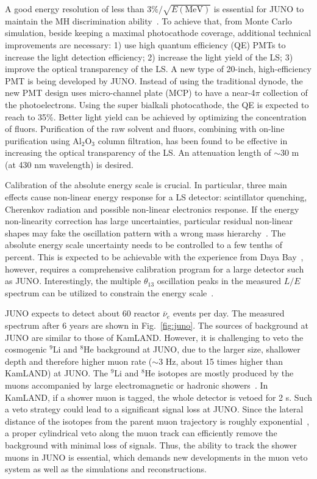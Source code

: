 A good energy resolution of less than $3\%/\sqrt{E(\textrm{MeV})}$ is essential for JUNO to maintain the MH discrimination ability~\cite{Li-PRD13}. 
To achieve that, from Monte Carlo simulation, beside keeping a maximal photocathode coverage, additional technical improvements are necessary: 
1) use high quantum efficiency (QE) PMTs to increase the light detection efficiency;
2) increase the light yield of the LS;
3) improve the optical transparency of the LS.
A new type of 20-inch, high-efficiency PMT is being developed by JUNO. Instead of using the traditional dynode, the new PMT design uses micro-channel plate (MCP) to have a near-4$\pi$ collection of the photoelectrons. 
Using the super bialkali photocathode, the QE is expected to reach to 35\%. 
Better light yield can be achieved by optimizing the concentration of fluors. 
Purification of the raw solvent and fluors, combining with on-line purification using Al$_2$O$_3$ column filtration, has been found to be effective in increasing the optical transparency of the LS. An attenuation length of $\sim$30 m (at 430 nm wavelength) is desired.

Calibration of the absolute energy scale is crucial. 
In particular, three main effects cause non-linear energy response for a LS detector: scintillator quenching, Cherenkov radiation and possible non-linear electronics response. 
If the energy non-linearity correction has large uncertainties, particular residual non-linear shapes may fake the oscillation pattern with a wrong mass hierarchy~\cite{Qian-PRD13}. 
The absolute energy scale uncertainty needs to be controlled to a few tenths of percent. 
This is expected to be achievable with the experience from Daya Bay~\cite{Zhang-Neutrino14}, however, requires a comprehensive calibration program for a large detector such as JUNO.
Interestingly, the multiple $\theta_{13}$ oscillation peaks in the measured $L/E$ spectrum can be utilized to constrain the energy scale~\cite{Li-PRD13}.

JUNO expects to detect about 60 reactor $\bar\nu_e$ events per day. The measured spectrum after 6 years are shown in Fig.~\ref{fig:juno}.
The sources of background at JUNO are similar to those of KamLAND. 
However, it is challenging to veto the cosmogenic $^9$Li and $^8$He background at JUNO, due to the larger size, shallower depth and therefore higher muon rate ($\sim$3 Hz, about 15 times higher than KamLAND) at JUNO. 
The $^9$Li and $^8$He isotopes are mostly produced by the muons accompanied by large electromagnetic or hadronic showers~\cite{KamLAND-spall}. In KamLAND, if a shower muon is tagged, the whole detector is vetoed for 2 s. Such a veto strategy could lead to a significant signal loss at JUNO. 
Since the lateral distance of the isotopes from the parent muon trajectory is roughly exponential~\cite{KamLAND-spall}, a proper cylindrical veto along the muon track can efficiently remove the background with minimal loss of signals. Thus, the ability to track the shower muons in JUNO is essential, which demands new developments in the muon veto system as well as the simulations and reconstructions.

